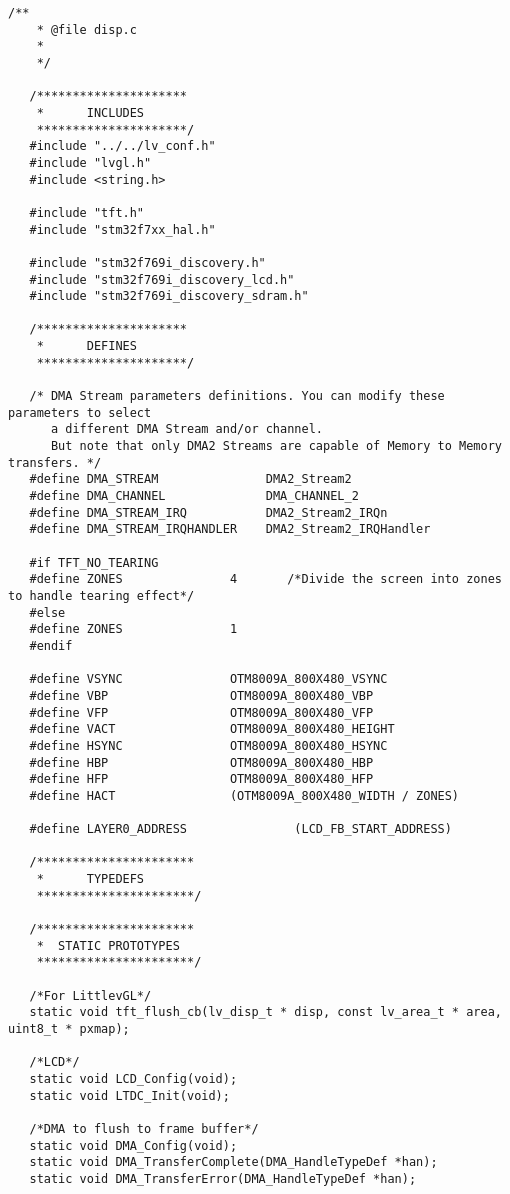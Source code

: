 \begin{lstlisting}[captionpos=t, caption={Fichero \texttt{tft.c}}]
    /**
    * @file disp.c
    *
    */
   
   /*********************
    *      INCLUDES
    *********************/
   #include "../../lv_conf.h"
   #include "lvgl.h"
   #include <string.h>
   
   #include "tft.h"
   #include "stm32f7xx_hal.h"
   
   #include "stm32f769i_discovery.h"
   #include "stm32f769i_discovery_lcd.h"
   #include "stm32f769i_discovery_sdram.h"
   
   /*********************
    *      DEFINES
    *********************/
   
   /* DMA Stream parameters definitions. You can modify these parameters to select
      a different DMA Stream and/or channel.
      But note that only DMA2 Streams are capable of Memory to Memory transfers. */
   #define DMA_STREAM               DMA2_Stream2
   #define DMA_CHANNEL              DMA_CHANNEL_2
   #define DMA_STREAM_IRQ           DMA2_Stream2_IRQn
   #define DMA_STREAM_IRQHANDLER    DMA2_Stream2_IRQHandler
   
   #if TFT_NO_TEARING
   #define ZONES               4       /*Divide the screen into zones to handle tearing effect*/
   #else
   #define ZONES               1
   #endif
   
   #define VSYNC               OTM8009A_800X480_VSYNC
   #define VBP                 OTM8009A_800X480_VBP
   #define VFP                 OTM8009A_800X480_VFP
   #define VACT                OTM8009A_800X480_HEIGHT
   #define HSYNC               OTM8009A_800X480_HSYNC
   #define HBP                 OTM8009A_800X480_HBP
   #define HFP                 OTM8009A_800X480_HFP
   #define HACT                (OTM8009A_800X480_WIDTH / ZONES)
   
   #define LAYER0_ADDRESS               (LCD_FB_START_ADDRESS)
   
   /**********************
    *      TYPEDEFS
    **********************/
   
   /**********************
    *  STATIC PROTOTYPES
    **********************/
   
   /*For LittlevGL*/
   static void tft_flush_cb(lv_disp_t * disp, const lv_area_t * area, uint8_t * pxmap);
   
   /*LCD*/
   static void LCD_Config(void);
   static void LTDC_Init(void);
   
   /*DMA to flush to frame buffer*/
   static void DMA_Config(void);
   static void DMA_TransferComplete(DMA_HandleTypeDef *han);
   static void DMA_TransferError(DMA_HandleTypeDef *han);
   

\end{lstlisting}
